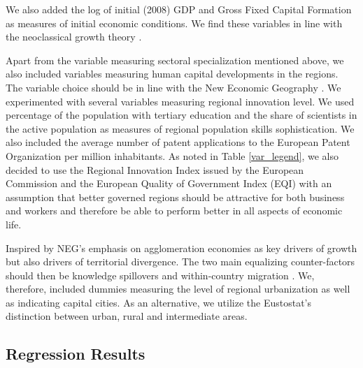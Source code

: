 \documentclass[11pt]{article}
\begin{document}
We also added the log of initial (2008) GDP and Gross Fixed Capital Formation as measures of initial economic conditions. We find these variables in line with the neoclassical growth theory \cite{iammarino2017regional}.%

Apart from the variable measuring sectoral specialization mentioned above, we also included variables measuring human capital developments in the regions. The variable choice should be in line with the New Economic Geography \citep{iammarino2017regional}. We experimented with several variables measuring regional innovation level. We used percentage of the population with tertiary education and the share of scientists in the active population as measures of regional population skills sophistication. We also included the average number of patent applications to the European Patent Organization per million inhabitants. As noted in Table \ref{var_legend}, we also decided to use the Regional Innovation Index issued by the European Commission and the European Quality of Government Index (EQI) with an assumption that better governed regions should be attractive for both business and workers and therefore be able to perform better in all aspects of economic life.

Inspired by NEG's emphasis on agglomeration economies as key drivers of growth but also drivers of territorial divergence. The two main equalizing counter-factors should then be knowledge spillovers and within-country migration  \citep{iammarino2017regional}. We, therefore, included dummies measuring the level of regional urbanization as well as indicating capital cities. As an alternative, we utilize the Eustostat's distinction between urban, rural and intermediate areas.

\subsection{Regression Results}
\end{document}
